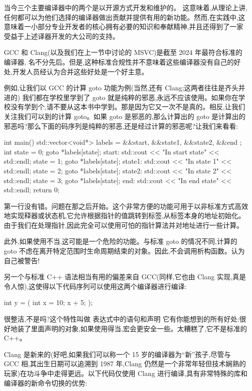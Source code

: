 
当今三个主要编译器中的两个是以开源方式开发和维护的。 这意味着,从理论上讲,任何都可以为他们选择的编译器做出贡献并提供有用的新功能。然而,在实践中,这意味着一小部分专业开发者的核心拥有必要的知识和奉献精神,并且还得到了一家受益于上述译器开发的大公司的支持。

GCC 和 Clang(以及我们在上一节中讨论的 MSVC)是截至 2024 年最符合标准的编译器, 名不分先后。但是,这种标准合规性并不意味着这些编译器没有自己的好处,开发人员经认为合并这些好处是一个好主意。

例如,让我们以 GCC 的计算 goto 功能为例(当然,还有 Clang;这两者往往是齐头并进的) 我们都在学校里学到了 goto 就是纯粹的邪恶,永远不应该使用。如果你在学校没有学到个,请不要从这本书中学到。那是因为它又一次不是真的。相反,让我们关注我们可以到的计算 goto。如果 goto 是邪恶的,那么计算出的 goto 是计算出的邪恶吗?那么下面的码序列是纯粹的邪恶,还是经过计算的邪恶呢?让我们来看看:

\begin{cpp}
int main() {
  std::vector<void*> labels = { &&start, &&state1, &&state2, &&end };
  int state = 0;
  goto *labels[state];
  start:
    std::cout << "In start state" << std::endl;
    state = 1;
    goto *labels[state];
  state1:
    std::cout << "In state 1" << std::endl;
    state = 2;
    goto *labels[state];
  state2:
    std::cout << "In state 2" << std::endl;
    state = 3;
    goto *labels[state];
  end:
    std::cout << "In end state" << std::endl;
    return 0;
}
\end{cpp}

第一行没有错。问题在那之后开始。这个非常方便的功能可用于以非标准方式高效地实现释器或状态机,它允许根据指针的值跳转到标签,从标签本身的地址初始化。由于我们在处理指针,因此完全可以使用可怕的指针算法并对地址进行一些计算。

此外,如果使用不当,这可能是一个危险的功能。与标准 goto 的情况不同,计算的 goto 不虑在离开特定范围时生命周期结束的对象。因此,不会调用析构函数。认为自己被警告! 

另一个与标准 C++ 语法相当有用的偏差来自 GCC(同样,它也由 Clang 实现,真是令人惊),这使得以下代码序列可以使用这两个编译器进行编译:

\begin{cpp}
int y = ({ int x = 10; x + 5; });
\end{cpp}

很整洁,不是吗?这个特性叫做 表达式中的语句和声明 它有你能想到的所有好处:很好地装了里面声明的对象,如果使用得当,宏会更安全一些。太糟糕了,它不是标准的 C++。

Clang 是新来的(好吧,如果我们可以称一个 15 岁的编译器为“新”孩子,尽管与 GCC 相,其出生日期可以追溯到 1987 年,Clang 仍然是一个非常年轻但技术娴熟的玩家)在功斗争中走得更远。以下代码仅使用 Clang 进行编译,具有非常特殊的库和编译器的新命令切换的优势:

